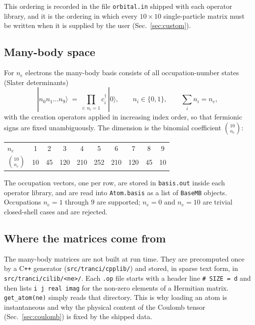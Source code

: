 \documentclass[11pt,a4paper]{article}
\newcommand{\op}[1]{\texttt{#1}}
\newcommand{\cd}[1]{c^{\dagger}_{#1}}
\begin{document}
\noindent
This ordering is recorded in the file \op{orbital.in} shipped with each operator
library, and it is the ordering in which every $10\times 10$ single-particle
matrix must be written when it is supplied by the user
(Sec.~\ref{sec:custom}).

\subsection{Many-body space}

For $n_e$ electrons the many-body basis consists of all occupation-number
states (Slater determinants)
\begin{equation}
  |n_0 n_1 \ldots n_9\rangle
  \;=\;\prod_{i:\,n_i=1}\cd{i}\,|0\rangle ,
  \qquad n_i\in\{0,1\},\qquad \sum_i n_i = n_e ,
\end{equation}
with the creation operators applied in increasing index order, so that fermionic
signs are fixed unambiguously.  The dimension is the binomial coefficient
$\binom{10}{n_e}$:

\begin{center}
\begin{tabular}{lccccccccc}
\toprule
$n_e$        & 1 & 2 & 3 & 4 & 5 & 6 & 7 & 8 & 9\\
$\binom{10}{n_e}$ & 10 & 45 & 120 & 210 & 252 & 210 & 120 & 45 & 10\\
\bottomrule
\end{tabular}
\end{center}

The occupation vectors, one per row, are stored in \op{basis.out} inside each
operator library, and are read into \op{Atom.basis} as a list of
\op{BaseMB} objects.  Occupations $n_e=1$ through $9$ are supported; $n_e=0$ and
$n_e=10$ are trivial closed-shell cases and are rejected.

\subsection{Where the matrices come from}

The many-body matrices are not built at run time.  They are precomputed once by
a C\texttt{++} generator (\op{src/tranci/cpplib/}) and stored, in sparse text
form, in \op{src/tranci/cilib/<ne>/}.  Each \op{.op} file starts with a header
line \op{\# SIZE = d} and then lists \op{i j real imag} for the non-zero
elements of a Hermitian matrix.  \op{get\_atom(ne)} simply reads that directory.
This is why loading an atom is instantaneous and why the physical content of the
Coulomb tensor (Sec.~\ref{sec:coulomb}) is fixed by the shipped data.
\end{document}
